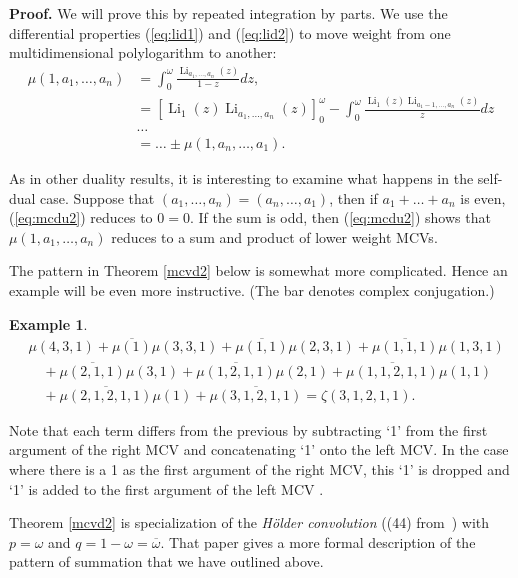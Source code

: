\documentclass[a4paper,a4paper]{article}
\newtheorem{Eg}{Example}
\newcommand{\li}{\operatorname{Li}}
\newcommand{\eop}{\vrule height .9ex width .9ex depth -.1ex}
\begin{document}
{\raggedleft \bf Proof.}
We will prove this by repeated integration by parts.
We use the differential properties (\ref{eq:lid1})
and (\ref{eq:lid2}) to move weight from one multidimensional
polylogarithm to another:
\begin{align*}
\mu(1, a_1, \dots, a_n) &= \int_0^\omega \frac{\li_{a_1, \dots, a_n}(z)}
{1-z}dz ,\\
&= \left[ \li_1(z) \li_{a_1, \dots, a_n}(z) \right]_0^\omega -
\int_0^\omega \frac{\li_1(z) \li_{a_1-1, \dots, a_n}(z)}{z}dz \\
&\dots \\
&=\dots \pm \mu(1, a_n, \dots, a_1).
\end{align*}
\eop


\vspace{\baselineskip}

As in other duality results, it is interesting to examine what happens in
the self-dual case.  Suppose that $ (a_1, \dots, a_n) = (a_n, \dots,
a_1) $, then if $ a_1 + \dots + a_n $ is even, (\ref{eq:mcdu2}) reduces
to $ 0 = 0 $.  If the sum is odd, then (\ref{eq:mcdu2}) shows that
$\mu(1, a_1, \dots, a_n) $ reduces to a sum and product of lower
weight MCVs.


The pattern in Theorem \ref{mcvd2} below is somewhat more complicated.
Hence an
example will be even more instructive.  (The bar denotes complex
conjugation.)

\begin{Eg}
\begin{equation*}
\begin{split}
&\mu(4,3,1) + \overline{\mu(1)}\mu(3,3,1) + \overline{\mu(1,1)}\mu(2,3,1)
+ \overline{\mu(1,1,1)}\mu(1,3,1) \\
&\quad + \overline{\mu(2,1,1)}\mu(3,1) + \overline{\mu(1,2,1,1)}\mu(2,1)
 + \overline{\mu(1,1,2,1,1)}\mu(1,1) \\
&\quad + \overline{\mu(2,1,2,1,1)}\mu(1) + \overline{\mu(3,1,2,1,1)} =
\zeta(3,1,2,1,1).
\end{split}
\end{equation*}
\end{Eg}

Note that each term differs from the previous by subtracting  `1'
 from the first argument of the right MCV and concatenating `1' onto
 the left MCV.  In the case where there is a 1 as the first argument of
 the right MCV, this `1' is dropped and  `1' is added to the first
 argument of the left MCV .

Theorem \ref{mcvd2} is  specialization of the {\em H\"older convolution} ((44)
from~\cite{BBBL}) with $ p = \omega $ and $ q = 1 - \omega =
\overline{\omega}$.   That paper gives a  more formal description of
the pattern of summation that we have outlined above.
\end{document}
